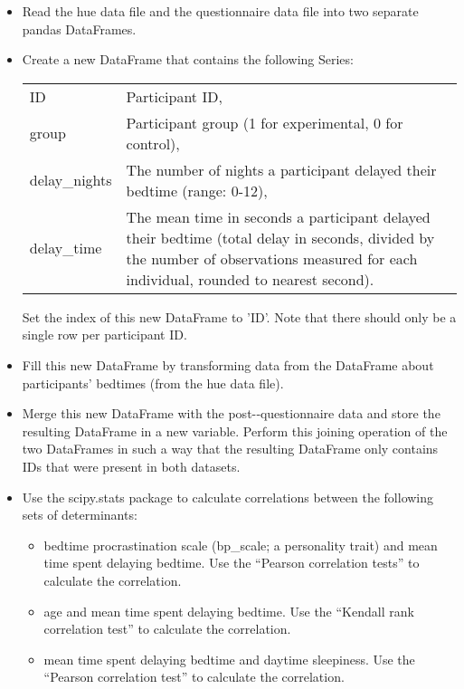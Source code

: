 \documentclass[a4paper]{report}
\theoremstyle{definition}
\begin{document}
\begin{itemize}
\item Read the hue data file and the questionnaire data file into two
separate pandas DataFrames.
\item Create a new DataFrame that contains the following Series:

\begin{tabular}{l p{}}
ID & Participant ID, \\
group & Participant group (1 for experimental, 0 for control), \\
delay\_nights & The number of nights a participant delayed their bedtime
	(range: 0-12),  \\
delay\_time  &
	The mean time in seconds a participant delayed their bedtime
	(total delay in seconds, divided by the number of observations
	measured for each individual, rounded to nearest second). \\
\end{tabular}

Set the index of this new DataFrame to 'ID'. Note that there should only
be a single row per participant ID.

\item Fill this new DataFrame by transforming data from the DataFrame
about participants' bedtimes (from the hue data file).

\item Merge this new DataFrame with the post-­‐questionnaire data and
store the resulting DataFrame in a new variable. Perform this joining
operation of the two DataFrames in such a way that the resulting DataFrame
only contains IDs that were present in both datasets.

\item Use the scipy.stats package to calculate correlations between the
	following sets of determinants:
	\begin{itemize}
	\item bedtime procrastination scale (bp\_scale; a personality
		trait) and mean time spent delaying bedtime. Use the
		``Pearson correlation tests'' to calculate the
		correlation.
	\item age and mean time spent delaying bedtime. Use the ``Kendall
		rank correlation test'' to calculate the correlation.
	\item mean time spent delaying bedtime and daytime sleepiness. Use
		the ``Pearson correlation test'' to calculate the
		correlation.
	\end{itemize}


\end{itemize}
\end{document}
